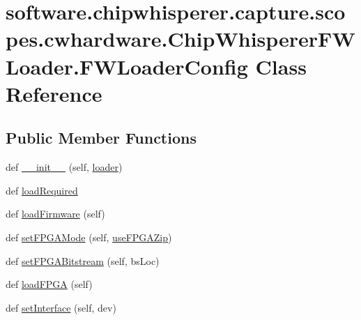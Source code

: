 \hypertarget{classsoftware_1_1chipwhisperer_1_1capture_1_1scopes_1_1cwhardware_1_1ChipWhispererFWLoader_1_1FWLoaderConfig}{}\section{software.\+chipwhisperer.\+capture.\+scopes.\+cwhardware.\+Chip\+Whisperer\+F\+W\+Loader.\+F\+W\+Loader\+Config Class Reference}
\label{classsoftware_1_1chipwhisperer_1_1capture_1_1scopes_1_1cwhardware_1_1ChipWhispererFWLoader_1_1FWLoaderConfig}
\subsection*{Public Member Functions}
\begin{DoxyCompactItemize}
\item 
def \hyperlink{classsoftware_1_1chipwhisperer_1_1capture_1_1scopes_1_1cwhardware_1_1ChipWhispererFWLoader_1_1FWLoaderConfig_a4d7984aa7b8b636f50ccd8d3efd699c8}{\+\_\+\+\_\+init\+\_\+\+\_\+} (self, \hyperlink{classsoftware_1_1chipwhisperer_1_1capture_1_1scopes_1_1cwhardware_1_1ChipWhispererFWLoader_1_1FWLoaderConfig_a1e1b431f39dbebf30f90f1567f9e661a}{loader})
\item 
def \hyperlink{classsoftware_1_1chipwhisperer_1_1capture_1_1scopes_1_1cwhardware_1_1ChipWhispererFWLoader_1_1FWLoaderConfig_a95414dc4868a91d79c88d371b5e66885}{load\+Required}
\item 
def \hyperlink{classsoftware_1_1chipwhisperer_1_1capture_1_1scopes_1_1cwhardware_1_1ChipWhispererFWLoader_1_1FWLoaderConfig_a2bea918e71d78d06cf848a47feddc6bd}{load\+Firmware} (self)
\item 
def \hyperlink{classsoftware_1_1chipwhisperer_1_1capture_1_1scopes_1_1cwhardware_1_1ChipWhispererFWLoader_1_1FWLoaderConfig_a966b70b3d27cb60d58434f6effa47c35}{set\+F\+P\+G\+A\+Mode} (self, \hyperlink{classsoftware_1_1chipwhisperer_1_1capture_1_1scopes_1_1cwhardware_1_1ChipWhispererFWLoader_1_1FWLoaderConfig_a3e13996f746ab7e02b2ff8283e701ff6}{use\+F\+P\+G\+A\+Zip})
\item 
def \hyperlink{classsoftware_1_1chipwhisperer_1_1capture_1_1scopes_1_1cwhardware_1_1ChipWhispererFWLoader_1_1FWLoaderConfig_a349cdfece84c402574451898fd07a0ca}{set\+F\+P\+G\+A\+Bitstream} (self, bs\+Loc)
\item 
def \hyperlink{classsoftware_1_1chipwhisperer_1_1capture_1_1scopes_1_1cwhardware_1_1ChipWhispererFWLoader_1_1FWLoaderConfig_ab5773820cb86b7fcef6c79537e1b19b8}{load\+F\+P\+G\+A} (self)
\item 
def \hyperlink{classsoftware_1_1chipwhisperer_1_1capture_1_1scopes_1_1cwhardware_1_1ChipWhispererFWLoader_1_1FWLoaderConfig_a7d9a533c18619a520b9acca2abece554}{set\+Interface} (self, dev)
\end{DoxyCompactItemize}
